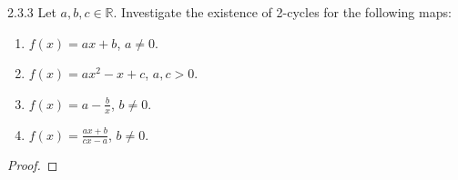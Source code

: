 \begin{problem}{2.3.3}
  Let $a,b,c \in \mathbb{R}$. Investigate the existence of 2-cycles for the following
  maps:
  \begin{enumerate}
    \item $f(x) = ax + b$, $a\neq 0$.
    \item $f(x) = ax^2 - x + c$, $a, c > 0$.
    \item $f(x) = a - \frac{b}{x}$, $b \neq 0$.
    \item $f(x) = \frac{ax + b}{cx-a}$, $b \neq 0$.
  \end{enumerate}
\end{problem}

\begin{proof}
\end{proof}
\newpage
